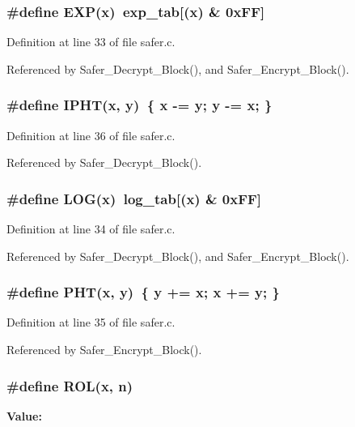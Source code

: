 \subsubsection{\setlength{\rightskip}{0pt plus 5cm}\#define EXP(x)\ exp\_\-tab[(x) \& 0x\-FF]}\label{safer_8c_a2}




Definition at line 33 of file safer.c.

Referenced by Safer\_\-Decrypt\_\-Block(), and Safer\_\-Encrypt\_\-Block().
\subsubsection{\setlength{\rightskip}{0pt plus 5cm}\#define IPHT(x, y)\ \{ x -= y; y -= x; \}}\label{safer_8c_a5}




Definition at line 36 of file safer.c.

Referenced by Safer\_\-Decrypt\_\-Block().
\subsubsection{\setlength{\rightskip}{0pt plus 5cm}\#define LOG(x)\ log\_\-tab[(x) \& 0x\-FF]}\label{safer_8c_a3}




Definition at line 34 of file safer.c.

Referenced by Safer\_\-Decrypt\_\-Block(), and Safer\_\-Encrypt\_\-Block().
\subsubsection{\setlength{\rightskip}{0pt plus 5cm}\#define PHT(x, y)\ \{ y += x; x += y; \}}\label{safer_8c_a4}




Definition at line 35 of file safer.c.

Referenced by Safer\_\-Encrypt\_\-Block().
\subsubsection{\setlength{\rightskip}{0pt plus 5cm}\#define ROL(x, {\bf n})}\label{safer_8c_a1}


{\bf Value:}

